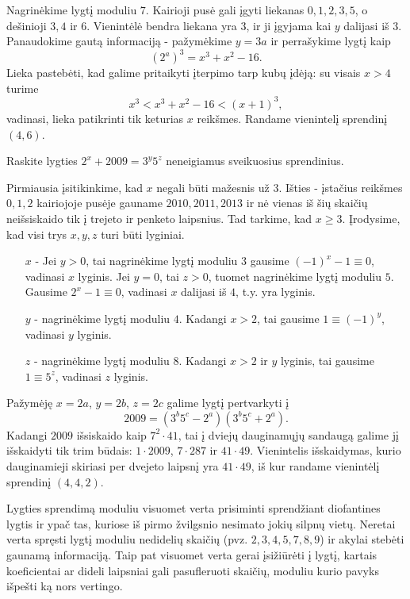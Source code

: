 \begin{sprendimas}
  Nagrinėkime lygtį moduliu $7$. Kairioji pusė gali įgyti liekanas $0, 1,
  2, 3, 5$, o dešinioji $3, 4$ ir $6$. Vienintėlė bendra liekana yra $3$, ir
  ji įgyjama kai $y$ dalijasi iš $3$. Panaudokime gautą informaciją -
  pažymėkime $y=3a$ ir perrašykime lygtį kaip $$(2^{a})^3 = x^3 + x^2 -
  16.$$ Lieka pastebėti, kad galime pritaikyti įterpimo tarp kubų įdėją: su
  visais $x>4$ turime $$x^3 < x^3 + x^2 -16 < (x+1)^3,$$ vadinasi, lieka
  patikrinti tik keturias $x$ reikšmes. Randame vienintelį sprendinį
  $(4,6)$.
\end{sprendimas}

\begin{pav}
   Raskite lygties $2^x + 2009 =
  3^y5^z$ neneigiamus sveikuosius sprendinius.
\end{pav} 
 
\begin{sprendimas}
  Pirmiausia įsitikinkime, kad $x$ negali būti mažesnis už $3$. Išties -
  įstačius reikšmes $0, 1, 2$ kairiojoje pusėje gauname $2010, 2011,
  2013$ ir nė vienas iš šių skaičių neišsiskaido tik į trejeto ir penketo
  laipsnius. Tad tarkime, kad $x\geq 3$. Įrodysime, kad visi trys
  $x, y, z$ turi būti lyginiai.
  \begin{itemize}
    \item[$x$ -] Jei $y>0$, tai nagrinėkime lygtį moduliu $3$ gausime
      $(-1)^x - 1 \equiv 0$, vadinasi $x$ lyginis. Jei $y=0$, tai
      $z>0$, tuomet nagrinėkime lygtį moduliu $5$. Gausime $2^x - 1 \equiv
      0$, vadinasi $x$ dalijasi iš $4$, t.y. yra lyginis.
    \item[$y$ -] nagrinėkime lygtį moduliu $4$. Kadangi $x>2$, tai gausime
      $1 \equiv (-1)^y$, vadinasi $y$ lyginis.
    \item[$z$ -] nagrinėkime lygtį moduliu $8$. Kadangi $x>2$ ir $y$ lyginis,
      tai gausime $1 \equiv 5^z$, vadinasi $z$ lyginis.
  \end{itemize}
  Pažymėję $x=2a$, $y=2b$, $z=2c$ galime lygtį pertvarkyti į $$2009 =
  (3^b5^c - 2^a)(3^b5^c + 2^a).$$ Kadangi $2009$ išsiskaido kaip $7^2\cdot
  41$, tai į dviejų dauginamųjų sandaugą galime jį išskaidyti tik trim
  būdais: $1\cdot 2009$, $7\cdot 287$ ir $41\cdot 49$. Vienintelis
  išskaidymas, kurio dauginamieji skiriasi per dvejeto laipsnį yra
  $41\cdot 49$, iš kur randame vienintėlį sprendinį $(4,4,2)$. 
\end{sprendimas}

Lygties sprendimą moduliu visuomet verta prisiminti sprendžiant diofantines
lygtis ir ypač tas, kuriose iš pirmo žvilgsnio nesimato jokių silpnų vietų.
Neretai verta spręsti lygtį moduliu nedidelių skaičių (pvz. $2, 3, 4, 5, 7,
8, 9$) ir akylai stebėti gaunamą informaciją. Taip pat visuomet verta gerai
įsižiūrėti į lygtį, kartais koeficientai ar dideli laipsniai gali
pasufleruoti skaičių, moduliu kurio pavyks išpešti ką nors vertingo. 

